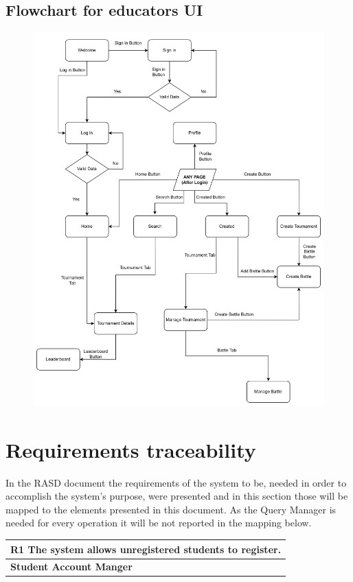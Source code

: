 \documentclass[12pt, a4paper]{report}
\begin{document}
    \section{Flowchart for educators UI}
    \begin{figure}[H]
        \centering
        \includegraphics[width=0.9\linewidth]{images/educators_UI.png}
    \end{figure}

\chapter{Requirements traceability}

In the RASD document the requirements of the system to be, needed in order to accomplish the system's purpose,
were presented and in this section those will be mapped to the elements presented in this document.
As the Query Manager is needed for every operation it will be not reported in the mapping below.

\begin{table}[H]
    \begin{tabularx}{\textwidth}{X}
    \textbf{R1} The system allows unregistered students to register.\\
    \hline 
    \textbf{Student Account Manger}
\end{tabularx}
\end{table}
\end{document}
